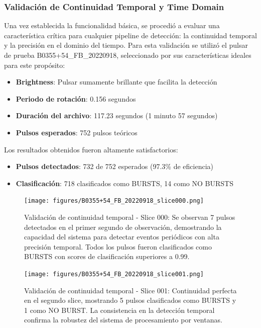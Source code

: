 \subsubsection{Validación de Continuidad Temporal y Time Domain}

Una vez establecida la funcionalidad básica, se procedió a evaluar una característica crítica para cualquier pipeline de detección: la continuidad temporal y la precisión en el dominio del tiempo. Para esta validación se utilizó el pulsar de prueba B0355+54\_FB\_20220918, seleccionado por sus características ideales para este propósito:

\begin{itemize}
    \item \textbf{Brightness}: Pulsar sumamente brillante que facilita la detección
    \item \textbf{Periodo de rotación}: 0.156 segundos
    \item \textbf{Duración del archivo}: 117.23 segundos (1 minuto 57 segundos)
    \item \textbf{Pulsos esperados}: 752 pulsos teóricos
\end{itemize}

Los resultados obtenidos fueron altamente satisfactorios:
\begin{itemize}
    \item \textbf{Pulsos detectados}: 732 de 752 esperados (97.3\% de eficiencia)
    \item \textbf{Clasificación}: 718 clasificados como BURSTS, 14 como NO BURSTS
\end{itemize}

\begin{figure}[H]
    \centering
    \texttt{[image: figures/B0355+54\_FB\_20220918\_slice000.png]}
    \caption{Validación de continuidad temporal - Slice 000: Se observan 7 pulsos detectados en el primer segundo de observación, demostrando la capacidad del sistema para detectar eventos periódicos con alta precisión temporal. Todos los pulsos fueron clasificados como BURSTS con scores de clasificación superiores a 0.99.}
    \label{fig:b0355_slice000}
\end{figure}


\begin{figure}[H]
    \centering
    \texttt{[image: figures/B0355+54\_FB\_20220918\_slice001.png]}
    \caption{Validación de continuidad temporal - Slice 001: Continuidad perfecta en el segundo slice, mostrando 5 pulsos clasificados como BURSTS y 1 como NO BURST. La consistencia en la detección temporal confirma la robustez del sistema de procesamiento por ventanas.}
    \label{fig:b0355_slice001}
\end{figure}


